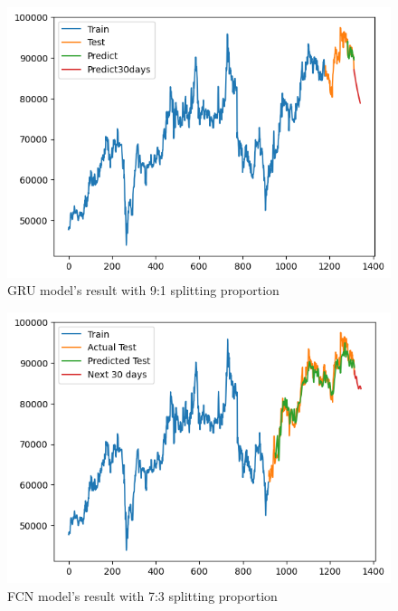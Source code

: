 \documentclass{ieeeojies}
\begin{document}
\begin{figure}[H]
  \centering
  \begin{minipage}{0.6\linewidth}
    \centering
    \includegraphics[width=\linewidth]{bibliography/diagram/GRU-VCB.png}
    \caption{GRU model’s result with 9:1 splitting proportion}
    \label{fig8}
  \end{minipage}
\end{figure}


\begin{figure}[H]
  \centering
  \begin{minipage}{0.6\linewidth}
    \centering
    \includegraphics[width=\linewidth]{bibliography/diagram/FCN-VCB.png}
    \caption{FCN model’s result with 7:3 splitting proportion}
    \label{fig8}
  \end{minipage}
\end{figure}
\end{document}
